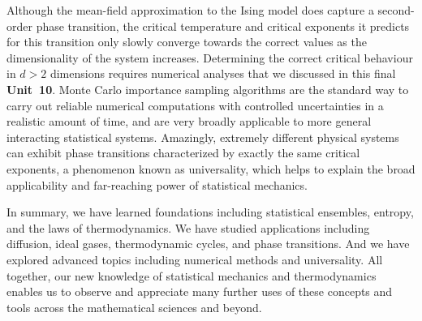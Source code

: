 Although the mean-field approximation to the Ising model does capture a second-order phase transition, the critical temperature and critical exponents it predicts for this transition only slowly converge towards the correct values as the dimensionality of the system increases.
Determining the correct critical behaviour in $d > 2$ dimensions requires numerical analyses that we discussed in this final \textbf{Unit~10}.
Monte Carlo importance sampling algorithms are the standard way to carry out reliable numerical computations with controlled uncertainties in a realistic amount of time, and are very broadly applicable to more general interacting statistical systems.
Amazingly, extremely different physical systems can exhibit phase transitions characterized by exactly the same critical exponents, a phenomenon known as universality, which helps to explain the broad applicability and far-reaching power of statistical mechanics.

In summary, we have learned foundations including statistical ensembles, entropy, and the laws of thermodynamics.
We have studied applications including diffusion, ideal gases, thermodynamic cycles, and phase transitions.
And we have explored advanced topics including numerical methods and universality.
All together, our new knowledge of statistical mechanics and thermodynamics enables us to observe and appreciate many further uses of these concepts and tools across the mathematical sciences and beyond.
